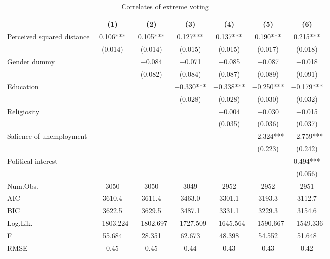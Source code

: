 \documentclass[
]{article}
\begin{document}
\begin{table}[!h]

\caption{\label{tab:extreme-party-model}Correlates of extreme voting}
\centering
\begin{tabular}[t]{lcccccc}
\toprule
  & (1) & (2) & (3) & (4) & (5) & (6)\\
\midrule
Perceived squared distance & \num{0.106}*** & \num{0.105}*** & \num{0.127}*** & \num{0.137}*** & \num{0.190}*** & \num{0.215}***\\
 & (\num{0.014}) & (\num{0.014}) & (\num{0.015}) & (\num{0.015}) & (\num{0.017}) & (\num{0.018})\\
Gender dummy &  & \num{-0.084} & \num{-0.071} & \num{-0.085} & \num{-0.087} & \num{-0.018}\\
 &  & (\num{0.082}) & (\num{0.084}) & (\num{0.087}) & (\num{0.089}) & (\num{0.091})\\
Education &  &  & \num{-0.330}*** & \num{-0.338}*** & \num{-0.250}*** & \num{-0.179}***\\
 &  &  & (\num{0.028}) & (\num{0.028}) & (\num{0.030}) & (\num{0.032})\\
Religiosity &  &  &  & \num{-0.004} & \num{-0.030} & \num{-0.015}\\
 &  &  &  & (\num{0.035}) & (\num{0.036}) & (\num{0.037})\\
Salience of unemployment &  &  &  &  & \num{-2.324}*** & \num{-2.759}***\\
 &  &  &  &  & (\num{0.223}) & (\num{0.242})\\
Political interest &  &  &  &  &  & \num{0.494}***\\
 &  &  &  &  &  & (\num{0.056})\\
\midrule
Num.Obs. & \num{3050} & \num{3050} & \num{3049} & \num{2952} & \num{2952} & \num{2951}\\
AIC & \num{3610.4} & \num{3611.4} & \num{3463.0} & \num{3301.1} & \num{3193.3} & \num{3112.7}\\
BIC & \num{3622.5} & \num{3629.5} & \num{3487.1} & \num{3331.1} & \num{3229.3} & \num{3154.6}\\
Log.Lik. & \num{-1803.224} & \num{-1802.697} & \num{-1727.509} & \num{-1645.564} & \num{-1590.667} & \num{-1549.336}\\
F & \num{55.684} & \num{28.351} & \num{62.673} & \num{48.398} & \num{54.552} & \num{51.648}\\
RMSE & \num{0.45} & \num{0.45} & \num{0.44} & \num{0.43} & \num{0.43} & \num{0.42}\\
\bottomrule
\end{tabular}
\end{table}
\end{document}
